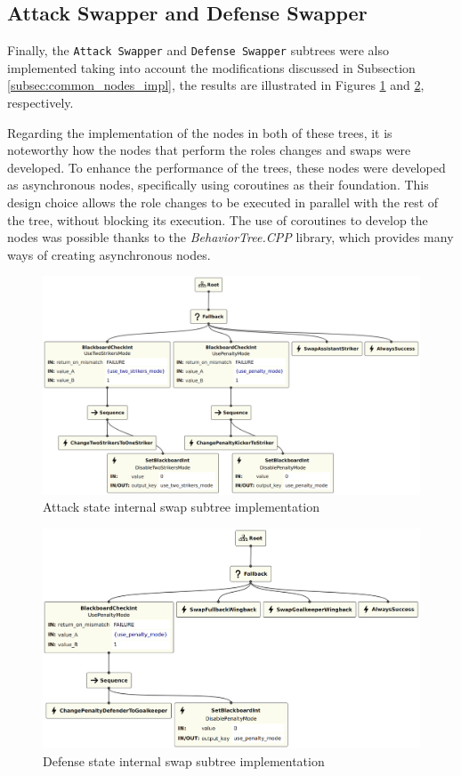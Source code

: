 \subsection{Attack Swapper and Defense Swapper}

Finally, the \texttt{Attack Swapper} and \texttt{Defense Swapper} subtrees were also implemented taking into account the modifications discussed in Subsection \ref{subsec:common_nodes_impl}, the results are illustrated in Figures \ref{fig:attack_swapper_impl} and \ref{fig:defense_swapper_impl}, respectively.

Regarding the implementation of the nodes in both of these trees, it is noteworthy how the nodes that perform the roles changes and swaps were developed. To enhance the performance of the trees, these nodes were developed as asynchronous nodes, specifically using coroutines as their foundation. This design choice allows the role changes to be executed in parallel with the rest of the tree, without blocking its execution. The use of coroutines to develop the nodes was possible thanks to the \textit{BehaviorTree.CPP} library, which provides many ways of creating asynchronous nodes.

\begin{figure}[!h]
    \centering
    \includegraphics[width=1.0\linewidth]{chapters/development/images/AttackSwapper.png}
    \caption{Attack state internal swap subtree implementation}
    \label{fig:attack_swapper_impl}
\end{figure}

\begin{figure}[!h]
    \centering
    \includegraphics[width=1.0\linewidth]{chapters/development/images/DefenseSwapper.png}
    \caption{Defense state internal swap subtree implementation}
    \label{fig:defense_swapper_impl}
\end{figure}
